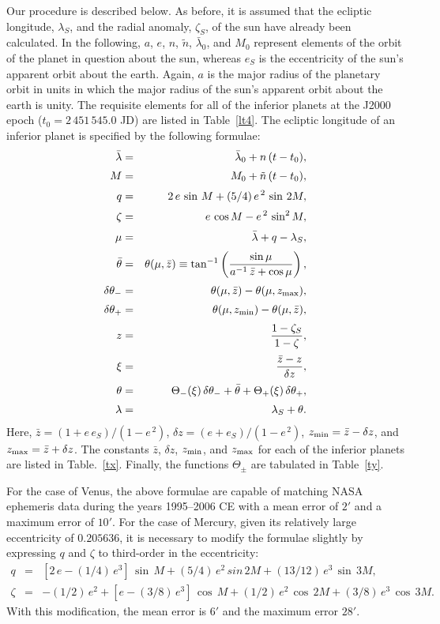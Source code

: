 Our procedure  is described below. As before, it is assumed that the ecliptic longitude, $\lambda_S$, and the
radial anomaly, $\zeta_S$, of the sun have already been calculated.
In the following, $a$, $e$, $n$, $\tilde{n}$, $\bar{\lambda}_0$, and $M_0$ represent  elements of the orbit of the planet in question
about the sun, whereas  $e_S$ is the eccentricity 
of the sun's apparent orbit about the earth.
Again, $a$ is the major radius of the planetary orbit in
units in which the major radius of the sun's apparent orbit about the
earth is unity. The requisite elements for all of the inferior planets at the J2000 epoch ($t_0=2\,451\,545.0$ JD)
are listed in Table~\ref{lt4}. The ecliptic longitude of an inferior planet
is specified by the following formulae:
\begin{eqnarray}
\bar{\lambda}&=&  \bar{\lambda}_0+ n\,(t-t_0) ,\\[0.5ex]
M &=& M_{0}  +\tilde{n}\,(t-t_0),\\[0.5ex]
q&=& 2\,e\,\sin \,M + (5/4)\,e^{\,2}\,\sin\,2M,\\[0.5ex]
\zeta &=& e\,\cos M - e^{\,2}\,\sin^2 M,\\[0.5ex]
\mu&=& \bar{\lambda}+q-\lambda_S,\\[0.5ex]
\bar{\theta} &=& \theta(\mu,\bar{z})\equiv \tan^{-1} \left(\frac{\sin\mu}{a^{-1}\,\bar{z}+\cos\mu}\right),\\[0.5ex]
\delta\theta_- &=& \theta(\mu,\bar{z}) - \theta(\mu,z_{\rm max}),\\[0.5ex]
\delta\theta_+&=& \theta(\mu,z_{\rm min}) - \theta(\mu,\bar{z}),\\[0.5ex]
z &=& \frac{1-\zeta_S}{1-\zeta},\label{e182x}\\[0.5ex]
\xi &=& \frac{\bar{z}-z}{\delta z},\\[0.5ex]
\theta  &=&\Theta_-(\xi)\,\delta\theta_-+ \bar{\theta}
+ \Theta_+(\xi)\,\delta\theta_+,\\[0.5ex]
\lambda &=&\lambda_S+ \theta.
\end{eqnarray}
Here, $\bar{z} = (1+e\,e_S)/(1-e^{\,2})$, $\delta z = (e+e_S)/(1-e^{\,2})$, $z_{\rm min} = \bar{z}-\delta z$,
and $z_{\rm max} = \bar{z}+\delta z$. The constants $\bar{z}$, $\delta z$, $z_{\rm min}$, and $z_{\rm max}$ 
for  each of the inferior planets are listed in Table.~\ref{tx}. Finally, the functions $\Theta_\pm$ are tabulated in Table~\ref{ty}.

For the case of Venus, the above formulae are capable of matching NASA ephemeris data during the years 1995--2006 CE
with a mean error of $2'$ and a maximum error of $10'$. For the case of Mercury, given its relatively large eccentricity of
$0.205636$, it is necessary to modify the formulae slightly by expressing $q$ and $\zeta$ to
third-order in the eccentricity:
\begin{eqnarray}
q &=& [2\,e - (1/4)\,e^3]\,\sin \,M + (5/4) \,e^2\,sin\,2M + (13/12)\,e^3\,\sin \,3M,\\[0.5ex]
\zeta &=& -(1/2)\,e^2+ [e-(3/8)\,e^3]\,\cos\,M + (1/2)\,e^2\,\cos\,2M + (3/8)\,e^3\,\cos\,3M.
\end{eqnarray}
With this modification, the mean error is $6'$ and the maximum error $28'$. 

